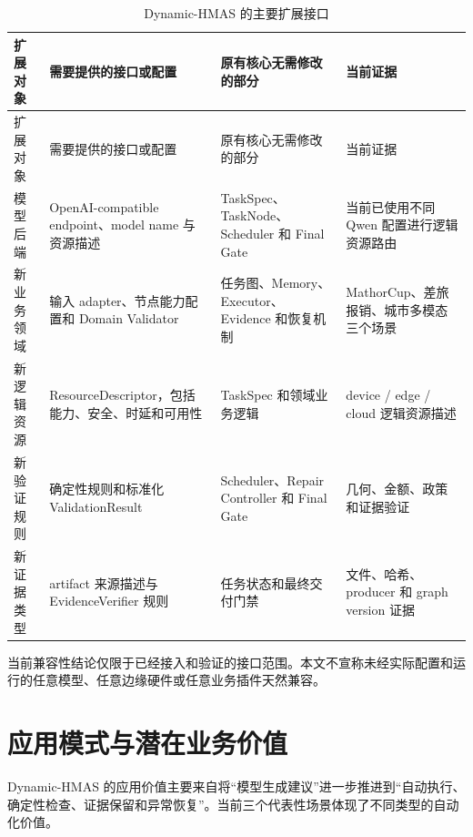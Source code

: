 \documentclass[UTF8,a4paper,12pt,oneside]{ctexbook}
\begin{document}
\begin{longtable}{@{}>{\raggedright\arraybackslash}p{}>{\raggedright\arraybackslash}p{}>{\raggedright\arraybackslash}p{}>{\raggedright\arraybackslash}p{}@{}}
\caption{Dynamic-HMAS 的主要扩展接口}
\label{tab:extension-interface}\\
\toprule
扩展对象 & 需要提供的接口或配置 & 原有核心无需修改的部分 & 当前证据\\
\midrule
\endfirsthead

\toprule
扩展对象 & 需要提供的接口或配置 & 原有核心无需修改的部分 & 当前证据\\
\midrule
\endhead

模型后端
&
OpenAI-compatible endpoint、model name 与资源描述
&
TaskSpec、TaskNode、Scheduler 和 Final Gate
&
当前已使用不同 Qwen 配置进行逻辑资源路由
\\

新业务领域
&
输入 adapter、节点能力配置和 Domain Validator
&
任务图、Memory、Executor、Evidence 和恢复机制
&
MathorCup、差旅报销、城市多模态三个场景
\\

新逻辑资源
&
ResourceDescriptor，包括能力、安全、时延和可用性
&
TaskSpec 和领域业务逻辑
&
device / edge / cloud 逻辑资源描述
\\

新验证规则
&
确定性规则和标准化 ValidationResult
&
Scheduler、Repair Controller 和 Final Gate
&
几何、金额、政策和证据验证
\\

新证据类型
&
artifact 来源描述与 EvidenceVerifier 规则
&
任务状态和最终交付门禁
&
文件、哈希、producer 和 graph version 证据
\\

\bottomrule
\end{longtable}

当前兼容性结论仅限于已经接入和验证的接口范围。本文不宣称未经实际配置和运行的任意模型、任意边缘硬件或任意业务插件天然兼容。


\section{应用模式与潜在业务价值}

Dynamic-HMAS 的应用价值主要来自将“模型生成建议”进一步推进到“自动执行、确定性检查、证据保留和异常恢复”。当前三个代表性场景体现了不同类型的自动化价值。
\end{document}
